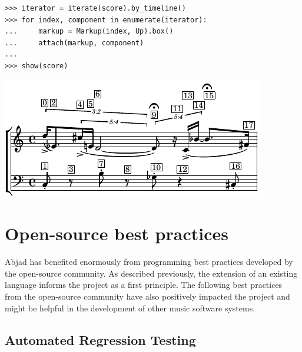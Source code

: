 \documentclass{article}
\begin{document}

\begin{lstlisting}
>>> iterator = iterate(score).by_timeline()
>>> for index, component in enumerate(iterator):
...     markup = Markup(index, Up).box()
...     attach(markup, component)
...
>>> show(score)
\end{lstlisting}
\includegraphics{assets/lilypond-a0f0024aef8572171e2aa922cc739cb1.pdf}

\section{Open-source best practices} \label{sec:open-source}

Abjad has benefited enormously from programming best practices developed by the
open-source community. As described previously, the extension of an existing
language informs the project as a first principle. The following best practices
from the open-source community have also positively impacted the project and
might be helpful in the development of other music software systems.

\subsection{Automated Regression Testing}
\end{document}
